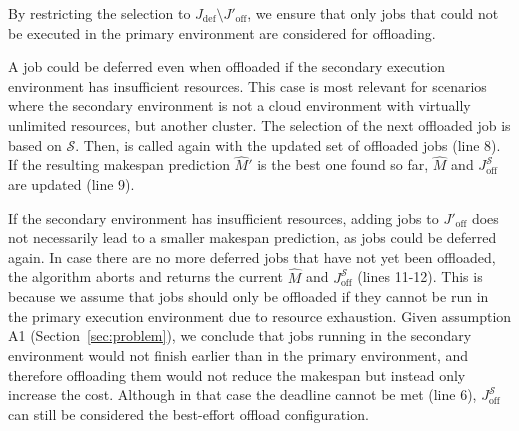 By restricting the selection to $J_{\text{def}} \setminus J'_\text{off}$, we ensure that only jobs that could not be executed in the primary environment are considered for offloading.

A job could be deferred even when offloaded if the secondary execution environment has insufficient resources. This case is most relevant for scenarios where the secondary environment is not a cloud environment with virtually unlimited resources, but another cluster.
The selection of the next offloaded job is based on $\mathcal{S}$.
Then,  is called again with the updated set of offloaded jobs (line 8).
If the resulting makespan prediction $\hat{M}'$ is the best one found so far, $\hat{M}$ and $J^{\mathcal{S}}_\text{off}$ are updated (line 9).

If the secondary environment has insufficient resources, adding jobs to $J'_\text{off}$ does not necessarily lead to a smaller makespan prediction, as jobs could be deferred again.
In case there are no more deferred jobs that have not yet been offloaded, the algorithm aborts and returns the current $\hat{M}$ and $J^{\mathcal{S}}_\text{off}$ (lines 11-12).
This is because we assume that jobs should only be offloaded if they cannot be run in the primary execution environment due to resource exhaustion.
Given assumption A1 (Section~\ref{sec:problem}), we conclude that jobs running in the secondary environment would not finish earlier than in the primary environment, and therefore offloading them would not reduce the makespan but instead only increase the cost.
Although in that case the deadline cannot be met (line 6), $J^{\mathcal{S}}_\text{off}$ can still be considered the best-effort offload configuration.


